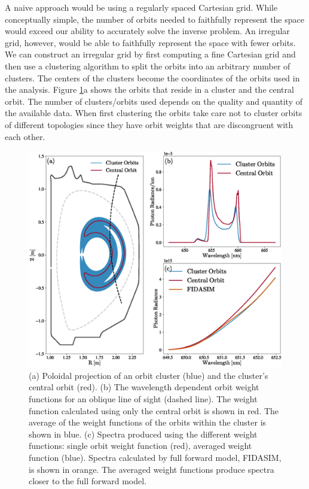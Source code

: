 A naive approach would be using a regularly spaced Cartesian grid. While conceptually simple, the number of orbits needed to faithfully represent the space would exceed our ability to accurately solve the inverse problem. An irregular grid, however, would be able to faithfully represent the space with fewer orbits.
We can construct an irregular grid by first computing a fine Cartesian grid and then use a clustering algorithm to split the orbits into an arbitrary number of clusters. The centers of the clusters become the coordinates of the orbits used in the analysis. Figure \ref{fig:orbit_cluster}a shows the orbits that reside in a cluster and the central orbit. The number of clusters/orbits used depends on the quality and quantity of the available data. When first clustering the orbits take care not to cluster orbits of different topologies since they have orbit weights that are discongruent with each other.
\begin{figure}[h!]
    \centering
    \includegraphics[width=15cm]{figures/orbit_cluster.eps}
    \caption{(a) Poloidal projection of an orbit cluster (blue) and the cluster's central orbit (red). (b) The wavelength dependent orbit weight functions for an oblique line of sight (dashed line). The weight function calculated using only the central orbit is shown in red. The average of the weight functions of the orbits within the cluster is shown in blue. (c) Spectra produced using the different weight functions: single orbit weight function (red), averaged weight function (blue). Spectra calculated by full forward model, FIDASIM, is shown in orange. The averaged weight functions produce spectra closer to the full forward model.}
    \label{fig:orbit_cluster}
\end{figure}

